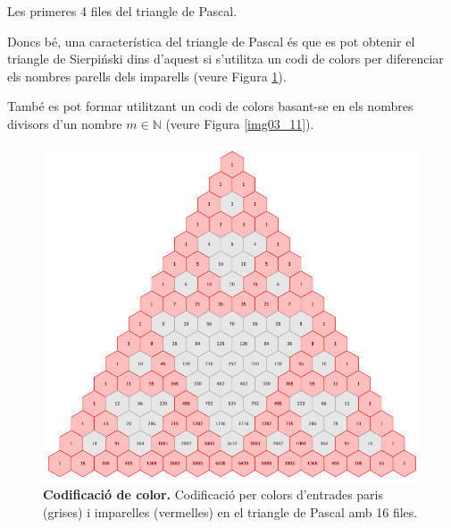 \documentclass[12pt,a4paper]{report}
\begin{document}
\begin{table}[!ht]
\centering
{}
\caption{Les primeres 4 files del triangle de Pascal.}
\label{tab03_05_01}
\end{table}

Doncs bé, una característica del triangle de Pascal és que es pot obtenir el triangle de Sierpiński dins d'aquest si s'utilitza un codi de colors per diferenciar els nombres parells dels imparells (veure Figura \ref{img03_10}).  

També es pot formar utilitzant un codi de colors basant-se en els nombres divisors d'un nombre $m\in\mathbb{N}$ (veure Figura \ref{img03_11}).

\begin{figure}[!ht]
\centering
\includegraphics[scale=1]{img/img03_10_sierpinski.pdf} 
\caption{\textbf{Codificació de color.} Codificació per colors d'entrades paris (grises) i imparelles
(vermelles) en el triangle de Pascal amb 16 files.}
\label{img03_10}
\end{figure}
\end{document}

